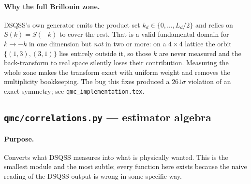 \documentclass[11pt,a4paper]{article}
\newcommand{\code}[1]{\texttt{#1}}
\newcommand{\file}[1]{\texttt{\textbf{#1}}}
\begin{document}
\paragraph{Why the full Brillouin zone.} DSQSS's own generator emits the product
set $k_d \in \{0,\dots,L_d/2\}$ and relies on $S(k) = S(-k)$ to cover the rest.
That is a valid fundamental domain for $k \to -k$ in one dimension but
\emph{not} in two or more: on a $4\times4$ lattice the orbit
$\{(1,3),(3,1)\}$ lies entirely outside it, so those $k$ are never measured and
the back-transform to real space silently loses their contribution. Measuring
the whole zone makes the transform exact with uniform weight and removes the
multiplicity bookkeeping. The bug this fixes produced a $261\sigma$ violation of
an exact symmetry; see \code{qmc\_implementation.tex}.

\subsection{\file{qmc/correlations.py} --- estimator algebra}
\label{sec:correlations}

\paragraph{Purpose.} Converts what DSQSS measures into what is physically
wanted. This is the smallest module and the most subtle; every function here
exists because the naive reading of the DSQSS output is wrong in some specific
way.
\end{document}

